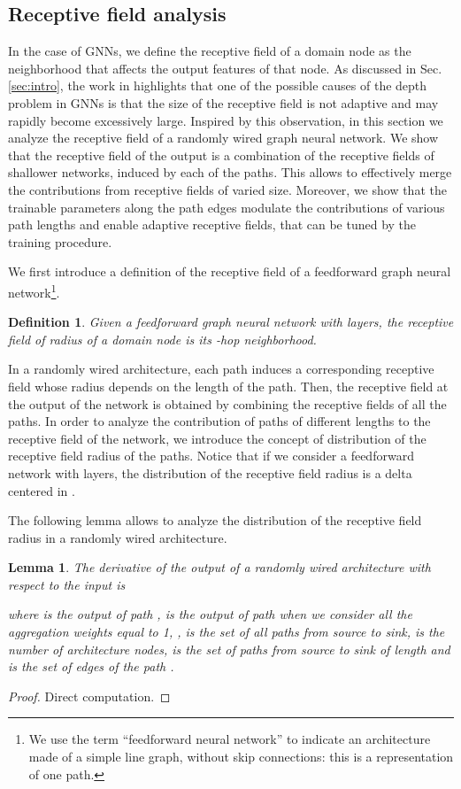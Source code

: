 \documentclass[10pt,twocolumn,twoside]{IEEEtran}
\newtheorem{lemma}[theorem]{Lemma}
\newtheorem{definition}{Definition}[section]
\begin{document}
\subsection{Receptive field analysis} \label{sec:receptive}

In the case of GNNs, we define the receptive field of a domain node as the neighborhood that affects the output features of that node. As discussed in Sec. \ref{sec:intro}, the work in \cite{xu2018representation} highlights that one of the possible causes of the depth problem in GNNs is that the size of the receptive field is not adaptive and may rapidly become excessively large. Inspired by this observation, in this section we analyze the receptive field of a randomly wired graph neural network. We show that the receptive field of the output is a combination of the receptive fields of shallower networks, induced by each of the paths. This allows to effectively merge the contributions from receptive fields of varied size. Moreover, we show that the trainable parameters along the path edges modulate the contributions of various path lengths and enable adaptive receptive fields, that can be tuned by the training procedure.

We first introduce a definition of the receptive field of a feedforward graph neural network\footnote{We use the term ``feedforward neural network'' to indicate an architecture made of a simple line graph, without skip connections: this is a representation of one path.}.
\begin{definition}
Given a feedforward graph neural network with  layers, the receptive field of radius  of a domain node is its -hop neighborhood. 
\end{definition} 
In a randomly wired architecture, each path induces a corresponding receptive field whose radius depends on the length of the path. Then, the receptive field at the output of the network is obtained by combining the receptive fields of all the paths. In order to analyze the contribution of paths of different lengths to the receptive field of the network, we introduce the concept of distribution of the receptive field radius of the paths. 
Notice that if we consider a feedforward network with  layers, the distribution of the receptive field radius is a delta centered in .

 
The following lemma allows to analyze the distribution of the receptive field radius in a randomly wired architecture.
\begin{lemma}
\label{lemma:derivative}
The derivative  of the output  of a randomly wired architecture with respect to the input  is

where  is the output of path ,  is the output of path  when we consider all the aggregation weights equal to 1, ,   is the set of all paths from source to sink,  is the number of architecture nodes,  is the set of paths from source to sink of length  and  is the set of edges of the path .
\end{lemma}
\begin{proof}
Direct computation.
\end{proof}
\end{document}
